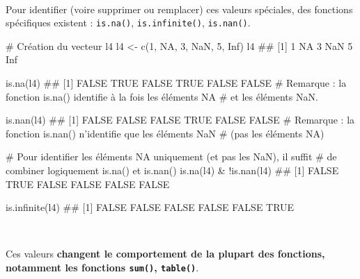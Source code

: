 \documentclass[12pt,twosided, notitlepage]{book}
\newenvironment{Shaded}{}{}
\newcommand{\KeywordTok}[1]{\textcolor[rgb]{0.00,0.00,1.00}{#1}}
\newcommand{\DecValTok}[1]{#1}
\newcommand{\StringTok}[1]{\textcolor[rgb]{0.00,0.50,0.50}{#1}}
\newcommand{\CommentTok}[1]{\textcolor[rgb]{0.00,0.50,0.00}{#1}}
\newcommand{\OtherTok}[1]{\textcolor[rgb]{1.00,0.25,0.00}{#1}}
\newcommand{\OperatorTok}[1]{#1}
\newcommand{\NormalTok}[1]{#1}
\renewenvironment{Shaded}{\begin{snugshade}}{\end{snugshade}}
\begin{document}
~

Pour identifier (voire supprimer ou remplacer) ces valeurs spéciales,
des fonctions spécifiques existent :
\texttt{is.na()},
\texttt{is.infinite()},
\texttt{is.nan()}.

\begin{Shaded}
\begin{Highlighting}[]
\CommentTok{# Création du vecteur l4}
\NormalTok{l4 <-}\StringTok{ }\KeywordTok{c}\NormalTok{(}\DecValTok{1}\NormalTok{, }\OtherTok{NA}\NormalTok{, }\DecValTok{3}\NormalTok{, }\OtherTok{NaN}\NormalTok{, }\DecValTok{5}\NormalTok{, }\OtherTok{Inf}\NormalTok{)}
\NormalTok{l4}
\NormalTok{  ## [1]   1  NA   3 NaN   5 Inf}

\KeywordTok{is.na}\NormalTok{(l4)}
\NormalTok{  ## [1] FALSE  TRUE FALSE  TRUE FALSE FALSE}
\CommentTok{# Remarque : la fonction is.na() identifie à la fois les éléments NA}
\CommentTok{# et les éléments NaN. }

\KeywordTok{is.nan}\NormalTok{(l4)}
\NormalTok{  ## [1] FALSE FALSE FALSE  TRUE FALSE FALSE}
\CommentTok{# Remarque : la fonction is.nan() n'identifie que les éléments NaN}
\CommentTok{# (pas les éléments NA)}

\CommentTok{# Pour identifier les éléments NA uniquement (et pas les NaN), il suffit}
\CommentTok{# de combiner logiquement is.na() et is.nan()}
\KeywordTok{is.na}\NormalTok{(l4) }\OperatorTok{&}\StringTok{ }\OperatorTok{!}\KeywordTok{is.nan}\NormalTok{(l4)}
\NormalTok{  ## [1] FALSE  TRUE FALSE FALSE FALSE FALSE}

\KeywordTok{is.infinite}\NormalTok{(l4)}
\NormalTok{  ## [1] FALSE FALSE FALSE FALSE FALSE  TRUE}
\end{Highlighting}
\end{Shaded}

~

Ces valeurs \textbf{changent le comportement de la plupart des
fonctions, notamment les fonctions \texttt{sum()},
\texttt{table()}}.
\end{document}
